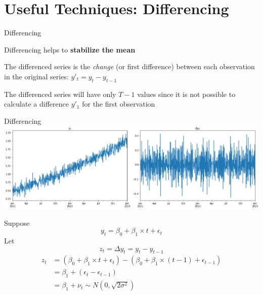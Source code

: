 \documentclass{beamer}
\newenvironment{wideitemize}{\itemize\addtolength{\itemsep}{10pt}}{\enditemize}
\begin{document}
\section{Useful Techniques: Differencing}

\begin{frame}{Differencing}
  \begin{wideitemize}
  \item Differencing helps to \textbf{stabilize the mean}
  \item The differenced series is the \emph{change} (or first difference) between each observation in the original series: $y'_t = y_t - y_{t-1}$
  \item The differenced series will have only $T-1$ values since it is not possible to calculate a difference $y'_1$ for the first observation
  \end{wideitemize}

\end{frame}

\begin{frame}{Differencing}
\includegraphics[width=\textwidth]{static/course_2_img/differencing.png}

Suppose $$y_t = \beta_0 + \beta_1 \times t + \epsilon_t$$
Let $$z_t = \Delta y_t = y_t - y_{t-1}$$
\begin{align*}
z_t &= (\beta_0 + \beta_1 \times t+ \epsilon_t) - (\beta_0 + \beta_1 \times (t-1) + \epsilon_{t-1})\\
    &= \beta_1 + (\epsilon_t - \epsilon_{t-1})\\
    &= \beta_1 + \nu_t \sim  N(0, \sqrt{2\sigma^2}) \\
\end{align*}


    
\end{frame}
\end{document}
